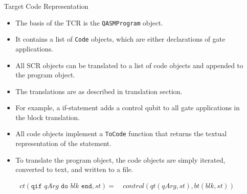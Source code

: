 \begin{frame}{Target Code Representation}
    \begin{itemize}
        \item The basis of the TCR is the \texttt{QASMProgram} object.
        \item It contains a list of \texttt{Code} objects, which are either declarations of gate applications. 
        \item All SCR objects can be translated to a list of code objects and appended to the program object.
        \item The translations are as described in translation section.
        \item For example, a if-statement adds a control qubit to all gate applications in the block translation.
        \item All code objects implement a \texttt{ToCode} function that returns the textual representation of the statement.
        \item To translate the program object, the code objects are simply iterated, converted to text, and written to a file. 
    \end{itemize}
    \vfill
    \begin{align*}        
        ct(\texttt{qif } qArg \texttt{ do } blk \texttt{ end}, st) = \ &  control(qt(qArg, st), bt(blk, st)) \\
    \end{align*}
\end{frame}

